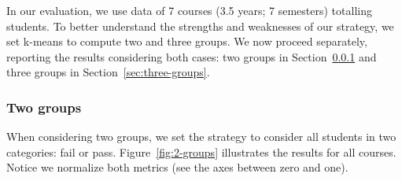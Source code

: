 In our evaluation, we use data of 7 courses (3.5 years; 7 semesters) totalling \totalStudents students. To better understand the strengths and weaknesses of our strategy, we set k-means to compute two and three groups. We now proceed separately, reporting the results considering both cases: two groups in Section~\ref{sec:two-groups} and three groups in Section~\ref{sec:three-groups}.

\subsubsection{Two groups}

\label{sec:two-groups}

When considering two groups, we set the strategy to consider all students in two categories: fail or pass. Figure~\ref{fig:2-groups} illustrates the results for all courses. Notice we normalize both metrics (see the axes between zero and one).

